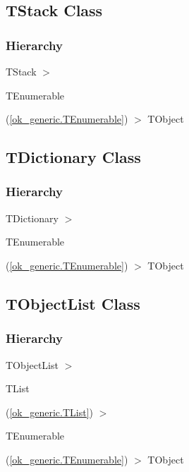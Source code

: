 \documentclass{report}
\newif\ifpdf
\begin{document}
\subsection*{TStack Class}
\fi
\label{ok_generic.TStack}
\subsubsection*{\large{\textbf{Hierarchy}}\normalsize\hspace{1ex}\hfill}
TStack {$>$} \begin{ttfamily}TEnumerable\end{ttfamily}(\ref{ok_generic.TEnumerable}) {$>$} 
TObject
\ifpdf
\subsection*{\large{\textbf{TDictionary Class}}\normalsize\hspace{1ex}\hrulefill}
\else
\subsection*{TDictionary Class}
\fi
\label{ok_generic.TDictionary}
\subsubsection*{\large{\textbf{Hierarchy}}\normalsize\hspace{1ex}\hfill}
TDictionary {$>$} \begin{ttfamily}TEnumerable\end{ttfamily}(\ref{ok_generic.TEnumerable}) {$>$} 
TObject
\ifpdf
\subsection*{\large{\textbf{TObjectList Class}}\normalsize\hspace{1ex}\hrulefill}
\else
\subsection*{TObjectList Class}
\fi
\label{ok_generic.TObjectList}
\subsubsection*{\large{\textbf{Hierarchy}}\normalsize\hspace{1ex}\hfill}
TObjectList {$>$} \begin{ttfamily}TList\end{ttfamily}(\ref{ok_generic.TList}) {$>$} \begin{ttfamily}TEnumerable\end{ttfamily}(\ref{ok_generic.TEnumerable}) {$>$} 
TObject
\ifpdf
\end{document}
